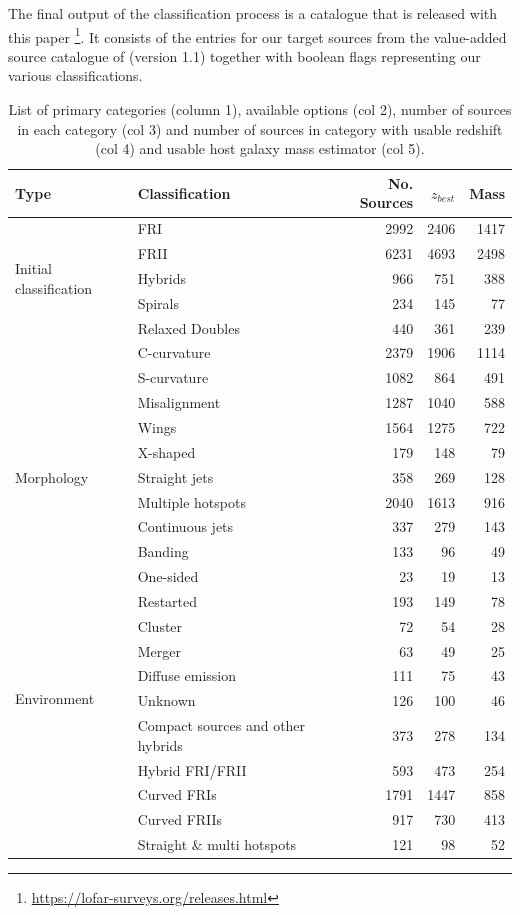 \documentclass{aa}
\begin{document}
The final output of the classification process is a catalogue that is released with this paper \footnote{\url{https://lofar-surveys.org/releases.html}}. It consists of the entries for our target sources from the value-added source catalogue of \cite{hardcastle23} (version 1.1) together with boolean flags representing our various classifications. 

\begin{table}
    \caption{List of primary categories (column 1), available options (col 2), number of sources in each category (col 3) and number of sources in category with usable redshift (col 4) and usable host galaxy mass estimator (col 5).}
    \label{tab:sources}
    \centering
    \begin{tabular}{l | l | r| r | r }
         Type & Classification & No. Sources & $z_{best}$ &Mass\\
         \hline 
         \multirow{5}{*}{Initial classification}
         & FRI & 2992 & 2406 & 1417\\
         & FRII & 6231 & 4693 & 2498\\
         & Hybrids & 966 & 751 & 388\\
         & Spirals & 234 & 145 & 77\\
         & Relaxed Doubles & 440 & 361 & 239 \\
         \hline 
         \multirow{11}{*}{Morphology}
         & C-curvature & 2379 & 1906 & 1114\\
         & S-curvature & 1082 & 864 & 491\\
         & Misalignment & 1287 & 1040 & 588\\
         & Wings & 1564 & 1275 & 722\\
         & X-shaped & 179 & 148 & 79\\
         & Straight jets & 358 & 269 & 128\\
         & Multiple hotspots & 2040 & 1613 & 916\\
         & Continuous jets & 337 & 279 & 143\\
         & Banding & 133 & 96 & 49\\
         & One-sided & 23 & 19 & 13\\
         & Restarted & 193 & 149 & 78\\
        \hline
        \multirow{6}{*}{Environment} 
        & Cluster & 72 & 54 & 28\\
        & Merger & 63 & 49 & 25 \\
        & Diffuse emission & 111 & 75 & 43\\
        & Unknown & 126 & 100 & 46\\
        \hline 
        \multirow{6}{*}{Derived Catalogue} 
         & Compact sources and other hybrids & 373 & 278 & 134 \\
         & Hybrid FRI/FRII & 593 & 473 & 254 \\ 
         & Curved FRIs & 1791 & 1447 & 858\\
         & Curved FRIIs & 917 & 730 & 413\\
        & Straight \& multi hotspots & 121 & 98 & 52 \\
         \hline 
         \end{tabular}
    

\end{table}
\end{document}
